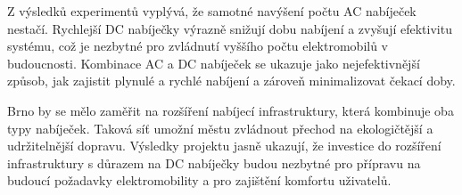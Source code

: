 \documentclass[a4paper,11pt]{article}
\begin{document}
Z výsledků experimentů vyplývá, že samotné navýšení počtu AC nabíječek nestačí. Rychlejší DC nabíječky výrazně snižují dobu nabíjení a zvyšují efektivitu systému, což je nezbytné pro zvládnutí vyššího počtu elektromobilů v budoucnosti. Kombinace AC a DC nabíječek se ukazuje jako nejefektivnější způsob, jak zajistit plynulé a rychlé nabíjení a zároveň minimalizovat čekací doby.

Brno by se mělo zaměřit na rozšíření nabíjecí infrastruktury, která kombinuje oba typy nabíječek. Taková síť umožní městu zvládnout přechod na ekologičtější a udržitelnější dopravu. Výsledky projektu jasně ukazují, že investice do rozšíření infrastruktury s důrazem na DC nabíječky budou nezbytné pro přípravu na budoucí požadavky elektromobility a pro zajištění komfortu uživatelů.

\newpage


\end{document}
